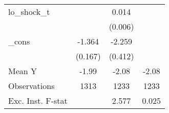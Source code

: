 {\begin{tabular}{l*{3}{c}}
\addlinespace
lo\_shock\_t  &                     &       0.014\sym{**} &                     \\
            &                     &     (0.006)         &                     \\
\addlinespace
\_cons      &      -1.364\sym{***}&      -2.259\sym{***}&                     \\
            &     (0.167)         &     (0.412)         &                     \\
\midrule
Mean Y      &       -1.99         &       -2.08         &       -2.08         \\
Observations&        1313         &        1233         &        1233         \\
Exc. Inst. F-stat&                     &       2.577         &       0.025         \\
\bottomrule
\end{tabular}
}
